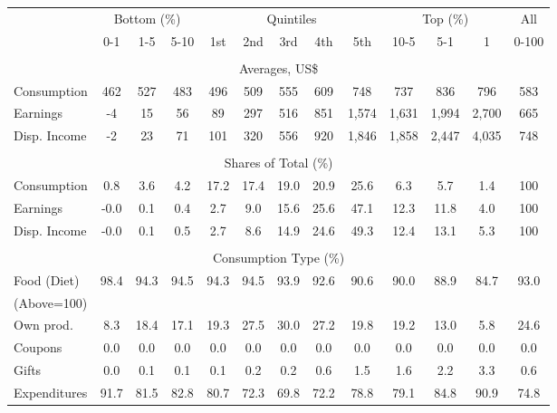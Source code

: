 \begin{tabular}{l c c c| c c c c c| c c c| c}
\toprule
&\multicolumn{3}{c|}{Bottom (\%)} & \multicolumn{5}{c|}{Quintiles} & \multicolumn{3}{c|}{Top (\%)} & All  \\
& 0-1 & 1-5 & 5-10 &  1st & 2nd & 3rd & 4th & 5th & 10-5 & 5-1 & 1 & 0-100 \\
\midrule \\
\multicolumn{13}{c}{Averages, US\$} \\
\midrule
Consumption  & 462  & 527  & 483  & 496  & 509  & 555  & 609  & 748  & 737  & 836  & 796  & 583 \\
Earnings         & -4 & 15 & 56 & 89 & 297 & 516 & 851 & 1,574 & 1,631 & 1,994 & 2,700 & 665 \\
Disp. Income & -2 & 23 & 71 & 101 & 320 & 556 & 920 & 1,846 & 1,858 & 2,447 & 4,035 & 748 \\
\midrule \\
\multicolumn{13}{c}{Shares of Total (\%)} \\
\midrule
Consumption  & 0.8   & 3.6   & 4.2   & 17.2   & 17.4   & 19.0   & 20.9   & 25.6   & 6.3   & 5.7   & 1.4   & 100 \\
Earnings         & -0.0  & 0.1  & 0.4  & 2.7  & 9.0  & 15.6  & 25.6  & 47.1  & 12.3  & 11.8  & 4.0  & 100 \\
Disp. Income & -0.0  & 0.1  & 0.5  & 2.7  & 8.6  & 14.9  & 24.6  & 49.3  & 12.4  & 13.1  & 5.3  & 100 \\
\midrule \\
\multicolumn{13}{c}{Consumption Type (\%)}  \\
\midrule
Food (Diet)  & 98.4 & 94.3 & 94.5 & 94.3 & 94.5 & 93.9 & 92.6 & 90.6 & 90.0 & 88.9 & 84.7 & 93.0 \\
(Above=100) & & & & & & & & & & & &  \\
\hspace{.3cm} Own prod.  & 8.3 & 18.4 & 17.1 & 19.3 & 27.5 & 30.0 & 27.2 & 19.8 & 19.2 & 13.0 & 5.8 & 24.6 \\
\hspace{.3cm} Coupons    & 0.0 & 0.0 & 0.0 & 0.0 & 0.0 & 0.0 & 0.0 & 0.0 & 0.0 & 0.0 & 0.0 & 0.0 \\
\hspace{.3cm} Gifts      & 0.0 & 0.1 & 0.1 & 0.1 & 0.2 & 0.2 & 0.6 & 1.5 & 1.6 & 2.2 & 3.3 & 0.6 \\
\hspace{.3cm} Expenditures  & 91.7 & 81.5 & 82.8 & 80.7 & 72.3 & 69.8 & 72.2 & 78.8 & 79.1 & 84.8 & 90.9 & 74.8 \\

\end{tabular}
